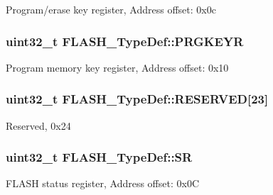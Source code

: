 Program/erase key register, Address offset\-: 0x0c \hypertarget{struct_f_l_a_s_h___type_def_a98a43d6cc0dfca44214d5e78115e8c51}{
\subsubsection[{P\-R\-G\-K\-E\-Y\-R}]{ uint32\-\_\-t F\-L\-A\-S\-H\-\_\-\-Type\-Def\-::\-P\-R\-G\-K\-E\-Y\-R}}\label{struct_f_l_a_s_h___type_def_a98a43d6cc0dfca44214d5e78115e8c51}
Program memory key register, Address offset\-: 0x10 \hypertarget{struct_f_l_a_s_h___type_def_a687f734afedcd12821de90664b55a542}{
\subsubsection[{R\-E\-S\-E\-R\-V\-E\-D}]{\setlength{\rightskip}{0pt plus 5cm}uint32\-\_\-t F\-L\-A\-S\-H\-\_\-\-Type\-Def\-::\-R\-E\-S\-E\-R\-V\-E\-D\mbox{[}23\mbox{]}}}\label{struct_f_l_a_s_h___type_def_a687f734afedcd12821de90664b55a542}
Reserved, 0x24 \hypertarget{struct_f_l_a_s_h___type_def_a52c4943c64904227a559bf6f14ce4de6}{
\subsubsection[{S\-R}]{ uint32\-\_\-t F\-L\-A\-S\-H\-\_\-\-Type\-Def\-::\-S\-R}}\label{struct_f_l_a_s_h___type_def_a52c4943c64904227a559bf6f14ce4de6}
F\-L\-A\-S\-H status register, Address offset\-: 0x0\-C

